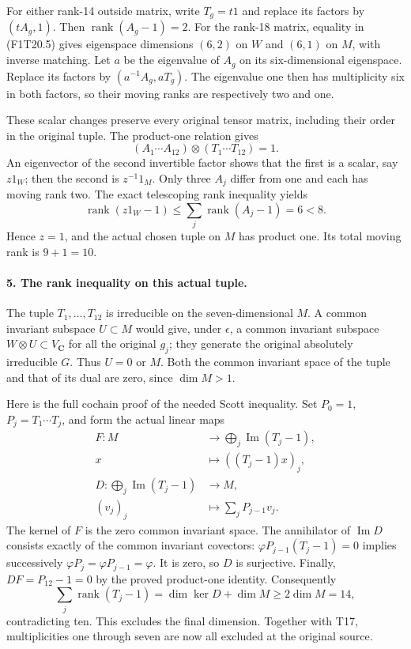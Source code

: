 For either rank-14 outside matrix, write \(T_g=t1\)
and replace its factors by \((tA_g,1)\). Then
\(\operatorname{rank}(A_g-1)=2\). For the rank-18
matrix, equality in (F1T20.5) gives eigenspace
dimensions \((6,2)\) on \(W\) and \((6,1)\)
on \(M\), with inverse matching. Let \(a\) be
the eigenvalue of \(A_g\) on its six-dimensional
eigenspace. Replace its factors by
\((a^{-1}A_g,aT_g)\). The eigenvalue one then
has multiplicity six in both factors, so their
moving ranks are respectively two and one.

These scalar changes preserve every original tensor
matrix, including their order in the original tuple.
The product-one relation gives
\[
 (A_1\cdots A_{12})\otimes(T_1\cdots T_{12})=1.
 \tag{F1T20.8}
\]
An eigenvector of the second invertible factor shows
that the first is a scalar, say \(z1_W\); then the
second is \(z^{-1}1_M\). Only three \(A_j\) differ
from one and each has moving rank two. The exact
telescoping rank inequality yields
\[
 \operatorname{rank}(z1_W-1)
 \le\sum_j\operatorname{rank}(A_j-1)=6<8.
 \tag{F1T20.9}
\]
Hence \(z=1\), and the actual chosen tuple on
\(M\) has product one. Its total moving rank is
\(9+1=10\).

\paragraph{5. The rank inequality on this actual tuple.}
The tuple \(T_1,\ldots,T_{12}\) is irreducible on
the seven-dimensional \(M\). A common invariant
subspace \(U\subset M\) would give, under
\(\epsilon\), a common invariant subspace
\(W\otimes U\subset V_{\mathbf C}\) for all the
original \(g_j\); they generate the original
absolutely irreducible \(G\). Thus \(U=0\) or
\(M\). Both the common invariant space of the
tuple and that of its dual are zero, since \(\dim M>1\).

Here is the full cochain proof of the needed Scott
inequality. Set \(P_0=1\), \(P_j=T_1\cdots T_j\),
and form the actual linear maps
\[
 \begin{aligned}
 F:M&\longrightarrow\bigoplus_j\operatorname{Im}(T_j-1),\\
 x&\longmapsto((T_j-1)x)_j,\\
 D:\bigoplus_j\operatorname{Im}(T_j-1)&\longrightarrow M,\\
 (v_j)_j&\longmapsto\sum_jP_{j-1}v_j.
 \end{aligned}
 \tag{F1T20.10}
\]
The kernel of \(F\) is the zero common invariant
space. The annihilator of \(\operatorname{Im}D\)
consists exactly of the common invariant covectors:
\(\varphi P_{j-1}(T_j-1)=0\) implies successively
\(\varphi P_j=\varphi P_{j-1}=\varphi\).
It is zero, so \(D\) is surjective. Finally,
\(DF=P_{12}-1=0\) by the proved product-one
identity. Consequently
\[
 \sum_j\operatorname{rank}(T_j-1)
   =\dim\ker D+\dim M\ge2\dim M=14,
 \tag{F1T20.11}
\]
contradicting ten. This excludes the final dimension.
Together with T17, multiplicities one through seven
are now all excluded at the original source.

